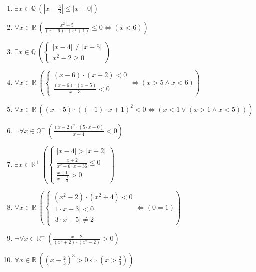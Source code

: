 \documentclass[11pt,a4paper]{article}
\begin{document}
\begin{enumerate}
\item $\displaystyle \exists x \in \mathbb{Q}\ \left( \left|x - \frac{4}{3}\right| \le \left|x + 0\right| \right)$
\item $\displaystyle \forall x \in \mathbb{R}\ \left( \frac{x^{2} + 5}{\left(x - 6\right) \cdot \left(x^{2} + 1\right)} \le 0 \iff \left( x < 6 \right) \right)$
\item $\displaystyle \exists x \in \mathbb{Q}\ \left( \begin{cases} \left|x - 4\right| \neq \left|x - 5\right| \\ x^{2} - 2 \ge 0 \end{cases} \right)$
\item $\displaystyle \forall x \in \mathbb{R}\ \left( \begin{cases} \left(x - 6\right) \cdot \left(x + 2\right) < 0 \\ \frac{\left(x - 6\right) \cdot \left(x - 5\right)}{x + 3} < 0 \end{cases} \iff \left( x > 5 \land x < 6 \right) \right)$
\item $\displaystyle \forall x \in \mathbb{R}\ \left( \left(x - 5\right) \cdot \left(\left(-1\right) \cdot x + 1\right)^{2} < 0 \iff \left( x < 1 \lor \left(x > 1 \land x < 5\right) \right) \right)$
\item $\displaystyle \lnot \forall x \in \mathbb{Q}^{+}\ \left( \frac{\left(x - 2\right)^{2} \cdot \left(5 \cdot x + 0\right)}{x + 4} < 0 \right)$
\item $\displaystyle \exists x \in \mathbb{R}^{+}\ \left( \begin{cases} \left|x - 4\right| > \left|x + 2\right| \\ \frac{x + 2}{x^{2} - 6 \cdot x - 36} \le 0 \\ \frac{x + 0}{x + \frac{1}{3}} > 0 \end{cases} \right)$
\item $\displaystyle \forall x \in \mathbb{R}\ \left( \begin{cases} \left(x^{2} - 2\right) \cdot \left(x^{2} + 4\right) < 0 \\ \left|1 \cdot x - 3\right| < 0 \\ \left|3 \cdot x - 5\right| \neq 2 \end{cases} \iff \left( 0 = 1 \right) \right)$
\item $\displaystyle \lnot \forall x \in \mathbb{R}^{+}\ \left( \frac{x - 2}{\left(x^{2} + 2\right) \cdot \left(x^{2} - 2\right)} > 0 \right)$
\item $\displaystyle \forall x \in \mathbb{R}\ \left( \left(x - \frac{2}{3}\right)^{3} > 0 \iff \left( x > \frac{2}{3} \right) \right)$
\end{enumerate}
\end{document}
